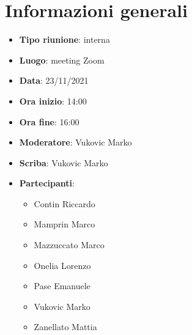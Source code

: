 \section{Informazioni generali}
\begin{itemize}
  \item \textbf{Tipo riunione}: interna
  \item \textbf{Luogo}: meeting Zoom
  \item \textbf{Data}: 23/11/2021
  \item \textbf{Ora inizio}: 14:00
  \item \textbf{Ora fine}: 16:00
  \item \textbf{Moderatore}: Vukovic Marko
  \item \textbf{Scriba}: Vukovic Marko
  \item \textbf{Partecipanti}:
  \begin{itemize}
    \item Contin Riccardo
    \item Mamprin Marco
    \item Mazzuccato Marco
    \item Onelia Lorenzo
    \item Pase Emanuele
    \item Vukovic Marko
    \item Zanellato Mattia
  \end{itemize}
\end{itemize}